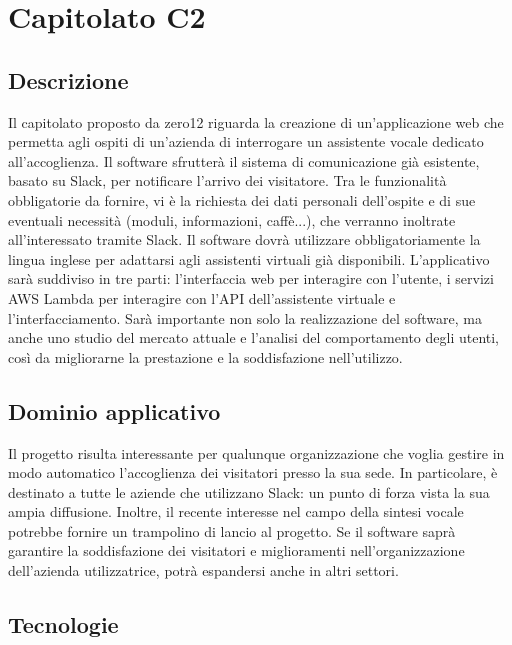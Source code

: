 \newpage
\section{Capitolato C2}

\subsection{Descrizione}

Il capitolato proposto da zero12 riguarda la creazione di un'applicazione
web che permetta agli ospiti di un'azienda di interrogare un assistente
vocale dedicato all'accoglienza. Il software sfrutterà il sistema
di comunicazione già esistente, basato su Slack, per notificare l'arrivo dei visitatore. Tra le funzionalità obbligatorie da fornire,
vi è la richiesta dei dati personali dell'ospite e di sue eventuali
necessità (moduli, informazioni, caffè...), che verranno inoltrate
all'interessato tramite Slack. Il software dovrà utilizzare obbligatoriamente
la lingua inglese per adattarsi agli assistenti virtuali già disponibili.
L'applicativo sarà suddiviso in tre parti: l'interfaccia web per interagire
con l'utente, i servizi AWS Lambda per interagire con l'API dell'assistente
virtuale e l'interfacciamento. Sarà importante non solo la realizzazione
del software, ma anche uno studio del mercato attuale e l'analisi
del comportamento degli utenti, così da migliorarne la prestazione
e la soddisfazione nell'utilizzo.

\subsection{Dominio applicativo}

Il progetto risulta interessante per qualunque organizzazione che voglia
gestire in modo automatico l'accoglienza dei visitatori presso la sua sede. In particolare,
è destinato a tutte le aziende che utilizzano Slack: un punto di forza vista
la sua ampia diffusione. Inoltre, il recente interesse nel campo della
sintesi vocale potrebbe fornire un trampolino di lancio al progetto.
Se il software saprà garantire la soddisfazione dei visitatori e miglioramenti
nell'organizzazione dell'azienda utilizzatrice, potrà espandersi
anche in altri settori.

\subsection{Tecnologie}

